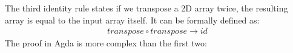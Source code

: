\documentclass{l4proj}
\begin{document}
The third identity rule states if we transpose a 2D array twice, the resulting array is equal to the input array itself. It can be formally defined as:
\begin{align}
    \label{identity:3}
    transpose \circ transpose \to id
\end{align}
The proof in Agda is more complex than the first two:
\begin{code}%
\>[0]\<%
\\
\>[0]\AgdaSpace{}%
\AgdaSymbol{:}%
\>[538I]\AgdaSymbol{\{}\AgdaSpace{}%
\AgdaSpace{}%
\AgdaSymbol{:}\AgdaSpace{}%
\AgdaSymbol{\}}\AgdaSpace{}%
\AgdaSpace{}%
\AgdaSymbol{\{}\AgdaSpace{}%
\AgdaSymbol{:}\AgdaSpace{}%
\AgdaSymbol{\}}\AgdaSpace{}%
\AgdaSpace{}%
\AgdaSymbol{(}\AgdaSpace{}%
\AgdaSymbol{:}\AgdaSpace{}%
\AgdaSpace{}%
\AgdaSymbol{(}\AgdaSpace{}%
\AgdaSpace{}%
\AgdaSymbol{)}\AgdaSpace{}%
\AgdaSymbol{)}\AgdaSpace{}%
\<%
\\
\>[.][@{}l@{}]\<[538I]%
\>[12]\AgdaSpace{}%
\AgdaSymbol{(}\AgdaSpace{}%
\AgdaSymbol{)}\AgdaSpace{}%
\AgdaSpace{}%
\<%
\\
\>[0]\AgdaSpace{}%
\AgdaSymbol{\{}\AgdaSpace{}%
\AgdaSymbol{\}}\AgdaSpace{}%
\AgdaSymbol{\{}\AgdaSymbol{\}}\AgdaSpace{}%
\AgdaSymbol{(}\AgdaInductiveConstructor{[]}\AgdaSpace{}%
\AgdaSpace{}%
\AgdaSymbol{)}\AgdaSpace{}%
\AgdaSymbol{=}\AgdaSpace{}%
\AgdaSpace{}%
\AgdaSymbol{(}\AgdaInductiveConstructor{[]}\AgdaSpace{}%
\AgdaSymbol{)}\AgdaSpace{}%
\AgdaSymbol{(}\AgdaSpace{}%
\AgdaSymbol{)}\<%
\\
\>[0]\AgdaSpace{}%
\AgdaSymbol{\{}\AgdaSymbol{\}}\AgdaSpace{}%
\AgdaSymbol{\{}\AgdaSymbol{\}}\AgdaSpace{}%
\AgdaInductiveConstructor{[]}\AgdaSpace{}%
\AgdaSymbol{=}\AgdaSpace{}%
\AgdaSpace{}%
\AgdaSymbol{(}\AgdaSpace{}%
\AgdaSymbol{(}\AgdaSpace{}%
\AgdaSymbol{\AgdaUnderscore{}}\AgdaSpace{}%

\end{code}
\end{document}
